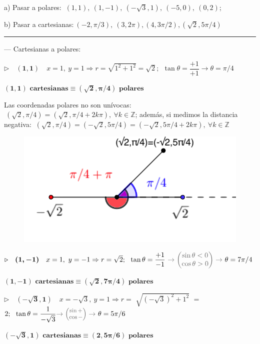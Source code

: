 \begin{miejercicio}  

\hspace{1cm} a) Pasar a polares: $\ (1,1),\ (1,-1), \ (-\sqrt 3 , 1),\ (-5,0),\ (0,2)$; 

\hspace{1cm} b) Pasar a cartesianas:$\ (-2,\pi/3),\ (3,2\pi), (4,3\pi/2), (\sqrt 2, 5\pi/4)$

\rule{300pt}{0.2pt}

--- Cartesianas a polares:

$\triangleright \quad \boldsymbol{(1,1)} \quad x=1,\ y=1 \Rightarrow r=\sqrt{1^2+1^2}=\sqrt 2;\ \ \tan \theta=\dfrac{+1}{+1}\to \theta = \pi/4$

\hspace{5cm} $\boldsymbol{(1,1) \text{ cartesianas} \equiv (\sqrt 2, \pi/4) \text{ polares}}$

\begin{multicols}{2}
Las coordenadas polares no son unívocas: $\ (\sqrt 2,\pi/4)=(\sqrt 2, \pi/4+2k\pi), \ \forall k\in \mathbb Z$; además, si medimos la distancia negativa: $\ (\sqrt 2,\pi/4)=(-\sqrt 2,5\pi/4)=(-\sqrt 2,5\pi/4+2k\pi), \ \forall k\in \mathbb Z$
\begin{figure}[H]
	\centering
	\includegraphics[width=.3\textwidth]{img-polares/polares23.png}
	\end{figure}
\end{multicols}

$\triangleright \quad \boldsymbol{(1,-1)} \quad x=1,\ y=-1 \Rightarrow r=\sqrt 2;\  \ \tan \theta=\dfrac{+1}{-1} \ \textcolor{gris}{ \to \mqty(\sin \theta < 0 \\ \cos \theta >0) \to } \ \theta = 7\pi/4$

\hspace{5cm} $\boldsymbol{(1,-1) \text{ cartesianas} \equiv (\sqrt 2, 7\pi/4) \text{ polares}}$

$\triangleright \quad \boldsymbol{(-\sqrt 3,1)} \quad x=-\sqrt 3,\ y=1 \Rightarrow r= $\scriptsize{ $\sqrt{(-\sqrt 3)^2+1^2}$ } \normalsize{$ =$}$2;\ \ \tan \theta=\dfrac{1}{-\sqrt 3} \textcolor{gris}{\footnotesize{\to \mqty(\sin + \\ \cos -) \to}} \ \theta = 5\pi/6$

\hspace{5cm} $\boldsymbol{(-\sqrt 3,1) \text{ cartesianas} \equiv ( 2, 5\pi/6) \text{ polares}}$


\end{miejercicio}
